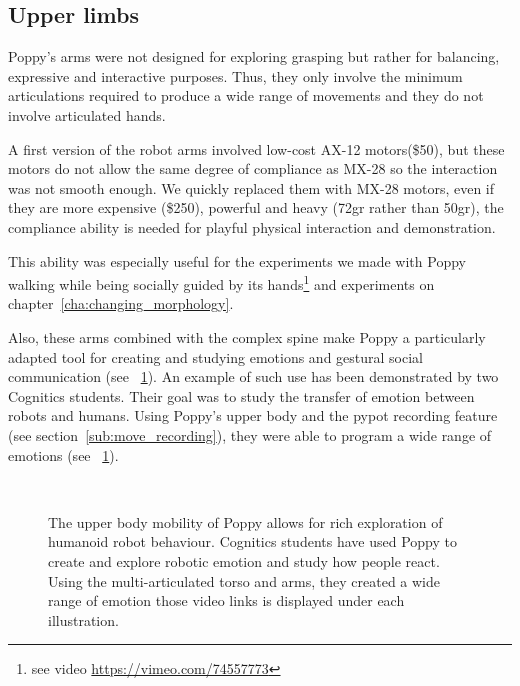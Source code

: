 \subsection{Upper limbs} %

Poppy's arms were not designed for exploring grasping but rather for balancing, expressive and interactive purposes. Thus, they only involve the minimum articulations required to produce a wide range of movements and they do not involve articulated hands.

A first version of the robot arms involved low-cost AX-12 motors(\$50), but these motors do not allow the same degree of compliance as MX-28 so the interaction was not smooth enough. We quickly replaced them with MX-28 motors, even if they are more expensive (\$250), powerful and heavy (72gr rather than 50gr), the compliance ability is needed for playful physical interaction and demonstration.

This ability was especially useful for the experiments we made with Poppy walking while being socially guided by its hands\footnote{see video \url{https://vimeo.com/74557773}} and experiments on chapter~\ref{cha:changing_morphology}.

Also, these arms combined with the complex spine make Poppy a particularly adapted tool for creating and studying emotions and gestural social communication (see \figurename~\ref{fig:TER_cognitic}). An example of such use has been demonstrated by two Cognitics students. Their goal was to study the transfer of emotion between robots and humans. Using Poppy's upper body and the pypot recording feature (see section~\ref{sub:move_recording}), they were able to program a wide range of emotions (see \figurename~\ref{fig:TER_cognitic}).


\begin{figure}[tb]
\centering
    \hfil
    \\
    \hfil
    \caption{The upper body mobility of Poppy allows for rich exploration of humanoid robot behaviour. Cognitics students have used Poppy to create and explore robotic emotion and study how people react. Using the multi-articulated torso and arms, they created a wide range of emotion those video links is displayed under each illustration. }
    \label{fig:TER_cognitic}
\end{figure}



